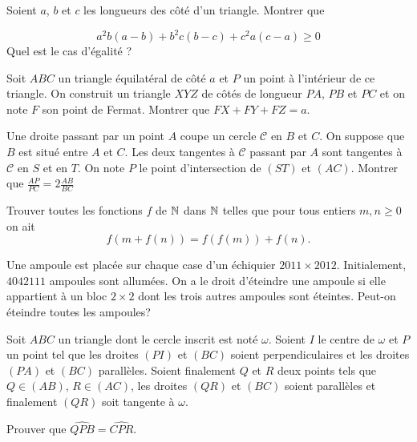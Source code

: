 \begin{exo}{}Soient $a$, $b$ et $c$ les longueurs
des côté d'un triangle. Montrer que 

\[
a^{2}b\left(a-b\right)+b^{2}c\left(b-c\right)+c^{2}a\left(c-a\right)\geqslant0
\]
Quel est le cas d'égalité ? 
\end{exo}

\begin{exo}{}
Soit $ABC$ un triangle équilatéral de côté $a$ et $P$ un point à l'intérieur de ce triangle. On construit un triangle $XYZ$ de côtés de longueur $PA$, $PB$ et $PC$ et on note $F$ son point de Fermat. Montrer que $FX+FY+FZ=a$.
\end{exo}

\begin{exo}{}
Une droite passant par un point $A$ coupe un cercle $ \mathcal{C}$ en $B$ et $C$. On suppose que $B$ est situé entre $A$ et $C$. Les deux tangentes à $ \mathcal{C}$ passant par $A$ sont tangentes à $ \mathcal{C}$ en $S$ et en $T$. On note $P$ le point d'intersection de $(ST)$ et $(AC)$. Montrer que 
$ \frac{AP}{PC}=2\frac{AB}{BC} $

\end{exo}

\begin{exo}{}Trouver toutes les fonctions $f$ de $ \mathbb{N}$ dans $ \mathbb{N}$ telles que pour tous entiers $m,n \geq 0$ on ait
$$f(m+f(n))=f(f(m))+f(n).$$
\end{exo}

\begin{exo}{}
Une ampoule est placée sur chaque case d'un échiquier $2011\times 2012$. Initialement, $4042111$ ampoules sont allumées. On a le droit d'éteindre une ampoule si elle appartient à un bloc $2 \times 2$ dont les trois autres ampoules sont éteintes. Peut-on éteindre toutes les ampoules?
\end{exo}



\begin{exo}{}
Soit $ABC$ un triangle dont le cercle inscrit est noté $ \omega$. Soient $I$ le centre  de $ \omega$ et $P$ un point tel que les droites $(PI)$ et $(BC)$ soient perpendiculaires et les droites $(PA)$ et $(BC)$ parallèles. Soient finalement $Q$ et $R$ deux points tels que $Q \in (AB)$, $R \in (AC)$, les droites $(QR)$ et $(BC)$ soient parallèles et finalement $(QR)$ soit tangente à $ \omega$.

Prouver que $ \widehat {QPB}= \widehat {CPR}$.
\end{exo}

